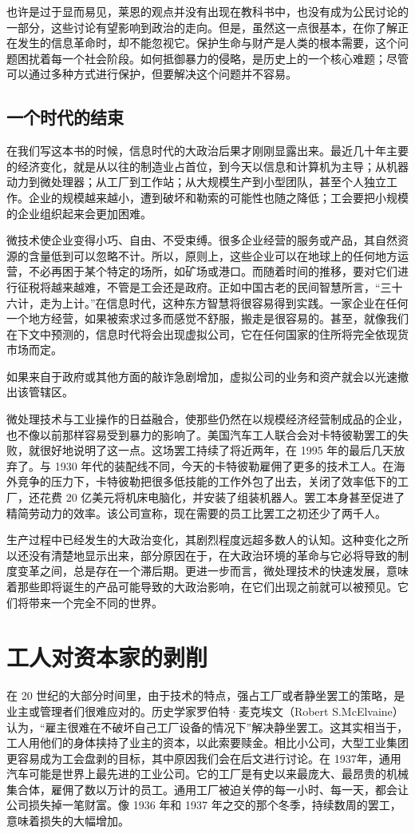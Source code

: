 也许是过于显而易见，莱恩的观点并没有出现在教科书中，也没有成为公民讨论的一部分，这些讨论有望影响到政治的走向。但是，虽然这一点很基本，在你了解正在发生的信息革命时，却不能忽视它。保护生命与财产是人类的根本需要，这个问题困扰着每一个社会阶段。如何抵御暴力的侵略，是历史上的一个核心难题；尽管可以通过多种方式进行保护，但要解决这个问题并不容易。

\subsection{一个时代的结束}
在我们写这本书的时候，信息时代的大政治后果才刚刚显露出来。最近几十年主要的经济变化，就是从以往的制造业占首位，到今天以信息和计算机为主导；从机器动力到微处理器；从工厂到工作站；从大规模生产到小型团队，甚至个人独立工作。企业的规模越来越小，遭到破坏和勒索的可能性也随之降低；工会要把小规模的企业组织起来会更加困难。

微技术使企业变得小巧、自由、不受束缚。很多企业经营的服务或产品，其自然资源的含量低到可以忽略不计。所以，原则上，这些企业可以在地球上的任何地方运营，不必再困于某个特定的场所，如矿场或港口。而随着时间的推移，要对它们进行征税将越来越难，不管是工会还是政府。正如中国古老的民间智慧所言，“三十六计，走为上计。”在信息时代，这种东方智慧将很容易得到实践。一家企业在任何一个地方经营，如果被索求过多而感觉不舒服，搬走是很容易的。甚至，就像我们在下文中预测的，信息时代将会出现虚拟公司，它在任何国家的住所将完全依现货市场而定。

如果来自于政府或其他方面的敲诈急剧增加，虚拟公司的业务和资产就会以光速撤出该管辖区。

微处理技术与工业操作的日益融合，使那些仍然在以规模经济经营制成品的企业，也不像以前那样容易受到暴力的影响了。美国汽车工人联合会对卡特彼勒罢工的失败，就很好地说明了这一点。这场罢工持续了将近两年，在 1995 年的最后几天放弃了。与 1930 年代的装配线不同，今天的卡特彼勒雇佣了更多的技术工人。在海外竞争的压力下，卡特彼勒把很多低技能的工作外包了出去，关闭了效率低下的工厂，还花费 20 亿美元将机床电脑化，并安装了组装机器人。罢工本身甚至促进了精简劳动力的效率。该公司宣称，现在需要的员工比罢工之初还少了两千人。

生产过程中已经发生的大政治变化，其剧烈程度远超多数人的认知。这种变化之所以还没有清楚地显示出来，部分原因在于，在大政治环境的革命与它必将导致的制度变革之间，总是存在一个滞后期。更进一步而言，微处理技术的快速发展，意味着那些即将诞生的产品可能导致的大政治影响，在它们出现之前就可以被预见。它们将带来一个完全不同的世界。

\section{工人对资本家的剥削}
在 20 世纪的大部分时间里，由于技术的特点，强占工厂或者静坐罢工的策略，是业主或管理者们很难应对的。历史学家罗伯特·麦克埃文（Robert S.McElvaine）认为，“雇主很难在不破坏自己工厂设备的情况下”解决静坐罢工。这其实相当于，工人用他们的身体挟持了业主的资本，以此索要赎金。相比小公司，大型工业集团更容易成为工会盘剥的目标，其中原因我们会在后文进行讨论。在 1937年，通用汽车可能是世界上最先进的工业公司。它的工厂是有史以来最庞大、最昂贵的机械集合体，雇佣了数以万计的员工。通用工厂被迫关停的每一小时、每一天，都会让公司损失掉一笔财富。像 1936 年和 1937 年之交的那个冬季，持续数周的罢工，意味着损失的大幅增加。

